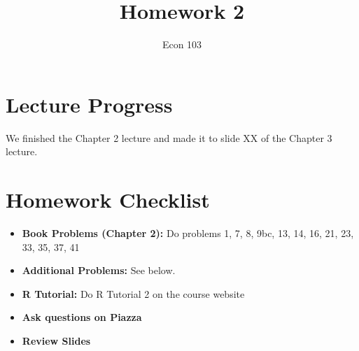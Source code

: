 \documentclass[addpoints,12pt]{exam}
\title{Homework 2}
\author{Econ 103}
\date{}
\begin{document}
\maketitle

\section*{Lecture Progress}
We finished the Chapter 2 lecture and made it to slide XX of the Chapter 3 lecture.

\section*{Homework Checklist}
\begin{itemize}[label = $\square$]
	\item \textbf{Book Problems (Chapter 2):} Do problems 1, 7, 8, 9bc, 13, 14, 16, 21, 23, 33, 35, 37, 41
	\item \textbf{Additional Problems:} See below.
	\item \textbf{R Tutorial:} Do R Tutorial 2 on the course website
	\item \textbf{Ask questions on Piazza}
	\item \textbf{Review Slides}
\end{itemize}
\end{document}
